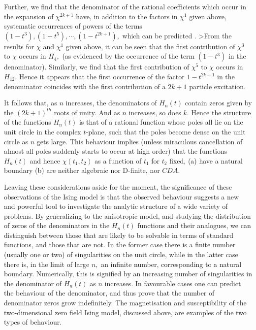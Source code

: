 Further, we find that the denominator of the rational coefficients
which occur in the expansion of $\chi^{2k+1}$ have, in addition to the
factors in $\chi^{1}$ given above, systematic occurrences of powers of the
terms $(1-t^3),(1-t^5),\cdots,(1-t^{2k+1}),$ which can be predicted
\cite{GGO98}.
>From the results for $\chi$ and
$\chi^{1}$ given above, it can be seen that the first contribution of
$\chi^{3}$ to  $\chi$ occurs in $H_4,$ (as evidenced by the occurrence
of the term $(1-t^3)$ in the denominator). Similarly, we find that
the first contribution of
$\chi^{5}$ to  $\chi$ occurs in $H_{12}.$
Hence it appears that the first occurrence of the factor $1-t^{2k+1}$ in
the denominator coincides with the first contribution of a $2k+1$ particle
excitation.

It follows that, as
$n$ increases, the denominators of $H_n(t)$ contain zeros given by the
$(2k+1)^{th}$ roots of unity. And as $n$ increases, so does $k.$ Hence
the structure of the functions $H_n(t)$ is that of a rational function
whose poles all lie on the unit circle in the complex $t$-plane, such
that the poles become dense on the unit circle as $n$ gets large. This
behaviour implies (unless miraculous cancellation of almost all poles
suddenly starts to occur at high order) that the functions $H_n(t)$ and
hence $\chi(t_1,t_2)$ as a function of $t_1$ for $t_2$ fixed, (a) have a
natural boundary (b) are neither algebraic nor D-finite, nor $CDA.$

Leaving these considerations aside for the moment, the significance of these
observations of the Ising model is that the observed behaviour
suggests a new and powerful tool to investigate the analytic
structure of a wide variety of problems. By generalizing to
the anisotropic model, and studying the distribution of zeros
of the denominators in the $H_n(t)$ functions and their analogues,
we can distinguish between those that are likely to be solvable
in terms of standard functions, and those that are not. In
the former case there is a finite number (usually one or two)
of singularities on the unit circle, while in the latter case
there is, in the limit of large $n,$
an infinite number, corresponding to a natural
boundary. Numerically, this is signified by an increasing
number of singularities in the denominator of $H_n(t)$
as $n$ increases. In favourable cases one can
predict the behaviour of the denominator, and thus prove
that the number of denominator zeros grow indefinitely.
The magnetisation and susceptibility of the
two-dimensional zero field Ising model, discussed above, are
examples of the two types of behaviour.

